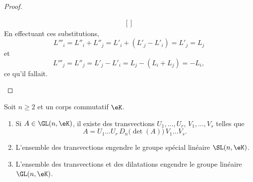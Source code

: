 \begin{proof}
\begin{subproof}
\begin{equation}
\begin{aligned}[]
                \end{aligned}
            \end{equation}
            En effectuant ces substitutions,
            \begin{equation}
                L'''_i=L''_i+L''_j=L'_i+(L'_j-L'_i)=L'_j=L_j
            \end{equation}
            et
            \begin{equation}
                L'''_j=L''_j=L'_j-L'_i=L_j-(L_i+L_j)=-L_i,
            \end{equation}
            ce qu'il fallait.
    \end{subproof}
\end{proof}

\begin{proposition}      \label{PropooFDNRooWFfUDd}
    Soit \( n\geq 2\) et un corps commutatif \( \eK\).
    \begin{enumerate}
        \item
            Si \( A\in \GL(n,\eK)\), il existe des transvections \( U_1,\ldots, U_r\), \( V_1,\ldots, V_s\) telles que
                \begin{equation}        \label{EQooKSQVooIpkdIE}
                    A=U_1\ldots U_r\,D_n\big( \det(A) \big)\,V_1\ldots V_s.
                \end{equation}
        \item       \label{ITEMooLRYXooSoKRiA}
            L'ensemble des transvections engendre le groupe spécial linéaire \( \SL(n,\eK)\).
        \item
            L'ensemble des transvections et des dilatations engendre le groupe linéaire \( \GL(n,\eK)\).
    \end{enumerate}
\end{proposition}

